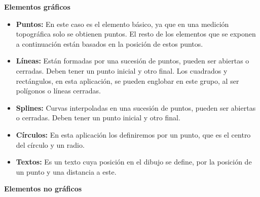 \textbf {Elementos gráficos}
\begin{itemize}
\item\textbf{Puntos:} En este caso es el elemento básico, ya que en una medición topográfica solo se obtienen puntos. El resto de los elementos que se exponen a continuación están basados en la posición de estos puntos.

\item\textbf{Líneas:} Están formadas por una sucesión de puntos, pueden ser abiertas o cerradas. Deben tener un punto inicial y otro final. Los cuadrados y rectángulos, en esta aplicación, se pueden englobar en este grupo, al ser polígonos o líneas cerradas.

\item\textbf{Splines:} Curvas interpoladas en una sucesión de puntos, pueden ser abiertas o cerradas. Deben tener un punto inicial y otro final.

\item\textbf{Círculos:} En esta aplicación los definiremos por un punto, que es el centro del círculo y un radio.

\item\textbf{Textos:} Es un texto cuya posición en el dibujo se define, por la posición de un punto y una distancia a este.

\end{itemize}

\textbf {Elementos no gráficos}

